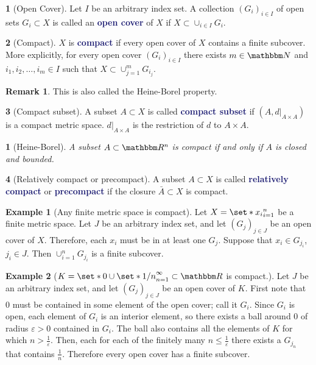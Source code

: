 \documentclass[12pt]{article}
\numberwithin{equation}{section}
\newcommand{\navy}[1]{\textcolor{MidnightBlue}{\bf #1}}
\theoremstyle{plain}
\newtheorem{theorem}{\color{ForestGreen}{\textbf{Theorem}}}[section]
\theoremstyle{definition}
\newtheorem{definition}{\color{MidnightBlue}{\textbf{Definition}}}[section]
\newtheorem{example}{\color{WildStrawberry}Example}[section]
\newtheorem*{remark}{Remark}
\def\Set{\set*}%
\def\ss{\subset}
\newcommand{\1}{\mathbbm 1}
\newcommand{\e}{\varepsilon}
\newcommand{\RR}{\mathbbm R}
\newcommand{\NN}{\mathbbm N}
\begin{document}
\begin{definition}[Open Cover]
	Let $I$ be an arbitrary index set. A collection $(G_i)_{i \in I}$ of open sets $G_i \subset X$ is called an \navy{open cover} of $X$ if $X \subset \cup_{i \in I} G_{i}$.
\end{definition}

\begin{definition}[Compact]
	$X$ is \navy{compact} if every open cover of $X$ contains a finite subcover. More explicitly, for every open cover $(G_i)_{i \in I}$ there exists $m \in \NN$ and $i_1, i_2, \ldots, i_m \in I$ such that $X \subset \cup_{j=1}^m G_{i_j}$.
	\begin{remark}
		This is also called the Heine-Borel property. 
	\end{remark}
\end{definition}

\begin{definition}[Compact subset]
	A subset $A \subset X$ is called \navy{compact subset} if $(A,d\vert_{A\times A})$ is a compact metric space. $d\vert_{A\times A}$ is the restriction of $d$ to $A \times A$.  
\end{definition}

\begin{theorem}[Heine-Borel]
	A subset $A \subset \RR^n$ is compact if and only if $A$ is closed and bounded.
\end{theorem}

\begin{definition}[Relatively compact or precompact]
	A subset $A \ss X$ is called \navy{relatively compact} or \navy{precompact} if the closure $\bar{A} \ss X$ is compact. 
\end{definition}

\begin{example}[Any finite metric space is compact]
	Let $X = \Set{x_i}_{i=1}^n$ be a finite metric space. Let $J$ be an arbitrary index set, and let $(G_j)_{j \in J}$ be an open cover of $X$. Therefore, each $x_i$ must be in at least one $G_j$. Suppose that $x_i \in G_{j_i}$, $j_i \in J$. Then $\cup_{i=1}^n G_{j_i}$ is a finite subcover. 
\end{example}

\begin{example}[$K = \Set{0} \cup \Set{1/n}_{n=1}^\infty \subset \RR$ is compact.]
	Let $J$ be an arbitrary index set, and let $(G_j)_{j \in J}$ be an open cover of $K$. First note that $0$ must be contained in some element of the open cover; call it $G_i$. Since $G_i$ is open, each element of $G_i$ is an interior element, so there exists a ball around $0$ of radius $\e > 0$ contained in $G_i$. The ball also contains all the elements of $K$ for which $n > \frac{1}{\e}$. Then, each for each of the finitely many $n \leq \frac{1}{\e}$ there exists a $G_{j_n}$ that contains $\frac{1}{n}$. Therefore every open cover has a finite subcover.
\end{example}
\end{document}
